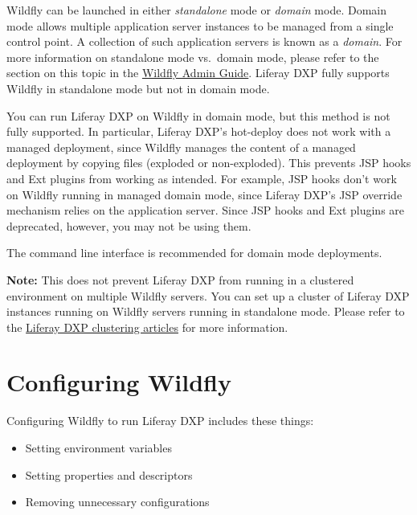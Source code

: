 Wildfly can be launched in either \emph{standalone} mode or
\emph{domain} mode. Domain mode allows multiple application server
instances to be managed from a single control point. A collection of
such application servers is known as a \emph{domain}. For more
information on standalone mode vs.~domain mode, please refer to the
section on this topic in the
\href{https://docs.jboss.org/author/display/WFLY/Admin+Guide\#AdminGuide-Operatingmodes}{Wildfly
Admin Guide}. Liferay DXP fully supports Wildfly in standalone mode but
not in domain mode.

You can run Liferay DXP on Wildfly in domain mode, but this method is
not fully supported. In particular, Liferay DXP's hot-deploy does not
work with a managed deployment, since Wildfly manages the content of a
managed deployment by copying files (exploded or non-exploded). This
prevents JSP hooks and Ext plugins from working as intended. For
example, JSP hooks don't work on Wildfly running in managed domain mode,
since Liferay DXP's JSP override mechanism relies on the application
server. Since JSP hooks and Ext plugins are deprecated, however, you may
not be using them.

The command line interface is recommended for domain mode deployments.

\noindent\hrulefill

\textbf{Note:} This does not prevent Liferay DXP from running in a
clustered environment on multiple Wildfly servers. You can set up a
cluster of Liferay DXP instances running on Wildfly servers running in
standalone mode. Please refer to the
\href{/docs/7-2/deploy/-/knowledge_base/d/liferay-clustering}{Liferay
DXP clustering articles} for more information.

\noindent\hrulefill

\section{Configuring Wildfly}\label{configuring-wildfly}

Configuring Wildfly to run Liferay DXP includes these things:

\begin{itemize}
\tightlist
\item
  Setting environment variables
\item
  Setting properties and descriptors
\item
  Removing unnecessary configurations
\end{itemize}

